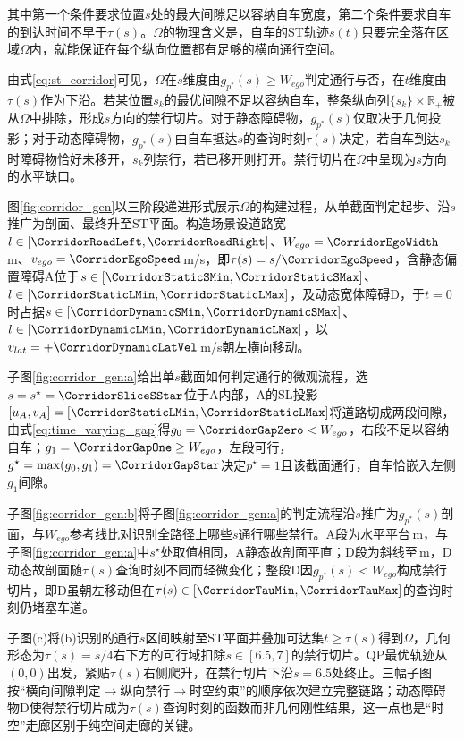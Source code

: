 其中第一个条件要求位置$s$处的最大间隙足以容纳自车宽度，第二个条件要求自车的到达时间不早于$\tau(s)$。$\Omega$的物理含义是，自车的ST轨迹$s(t)$只要完全落在区域$\Omega$内，就能保证在每个纵向位置都有足够的横向通行空间。

由式\eqref{eq:st_corridor}可见，$\Omega$在$s$维度由$g_{p^*}(s)\geq W_{ego}$判定通行与否，在$t$维度由$\tau(s)$作为下沿。若某位置$s_k$的最优间隙不足以容纳自车，整条纵向列$\{s_k\}\times \mathbb{R}_+$被从$\Omega$中排除，形成$s$方向的禁行切片。对于静态障碍物，$g_{p^*}(s)$仅取决于几何投影；对于动态障碍物，$g_{p^*}(s)$由自车抵达$s$的查询时刻$\tau(s)$决定，若自车到达$s_k$时障碍物恰好未移开，$s_k$列禁行，若已移开则打开。禁行切片在$\Omega$中呈现为$s$方向的水平缺口。

图\ref{fig:corridor_gen}以三阶段递进形式展示$\Omega$的构建过程，从单截面判定起步、沿$s$推广为剖面、最终升至ST平面。构造场景设道路宽$l\in[\CorridorRoadLeft,\CorridorRoadRight]$、$W_{ego}=\CorridorEgoWidth$\,m、$v_{ego}=\CorridorEgoSpeed$\,m/s，即$\tau(s)=s/\CorridorEgoSpeed$，含静态偏置障碍A位于$s\in[\CorridorStaticSMin,\CorridorStaticSMax]$、$l\in[\CorridorStaticLMin,\CorridorStaticLMax]$，及动态宽体障碍D，于$t=0$时占据$s\in[\CorridorDynamicSMin,\CorridorDynamicSMax]$、$l\in[\CorridorDynamicLMin,\CorridorDynamicLMax]$，以$v_{lat}=+\CorridorDynamicLatVel$\,m/s朝左横向移动。

子图\ref{fig:corridor_gen:a}给出单$s$截面如何判定通行的微观流程，选$s=s^\star=\CorridorSliceSStar$位于A内部，A的SL投影$[u_A,v_A]=[\CorridorStaticLMin,\CorridorStaticLMax]$将道路切成两段间隙，由式\eqref{eq:time_varying_gap}得$g_0=\CorridorGapZero<W_{ego}$，右段不足以容纳自车；$g_1=\CorridorGapOne\geq W_{ego}$，左段可行，$g^\star=\max(g_0,g_1)=\CorridorGapStar$决定$p^\star=1$且该截面通行，自车恰嵌入左侧$g_1$间隙。

子图\ref{fig:corridor_gen:b}将子图\ref{fig:corridor_gen:a}的判定流程沿$s$推广为$g_{p^*}(s)$剖面，与$W_{ego}$参考线比对识别全路径上哪些$s$通行哪些禁行。A段为水平平台\CorridorGapOne\,m，与子图\ref{fig:corridor_gen:a}中$s^\star$处取值相同，A静态故剖面平直；D段为斜线\CorridorDynamicGapMin 至\CorridorDynamicGapMax\,m，D动态故剖面随$\tau(s)$查询时刻不同而轻微变化；整段D因$g_{p^*}(s)<W_{ego}$构成禁行切片，即D虽朝左移动但在$\tau(s)\in[\CorridorTauMin,\CorridorTauMax]$的查询时刻仍堵塞车道。

子图(c)将(b)识别的通行$s$区间映射至ST平面并叠加可达集$t\geq\tau(s)$得到$\Omega$，几何形态为$\tau(s)=s/4$右下方的可行域扣除$s\in[6.5,7]$的禁行切片。QP最优轨迹从$(0,0)$出发，紧贴$\tau(s)$右侧爬升，在禁行切片下沿$s=6.5$处终止。三幅子图按“横向间隙判定$\to$纵向禁行$\to$时空约束”的顺序依次建立完整链路；动态障碍物D使得禁行切片成为$\tau(s)$查询时刻的函数而非几何刚性结果，这一点也是“时空”走廊区别于纯空间走廊的关键。


